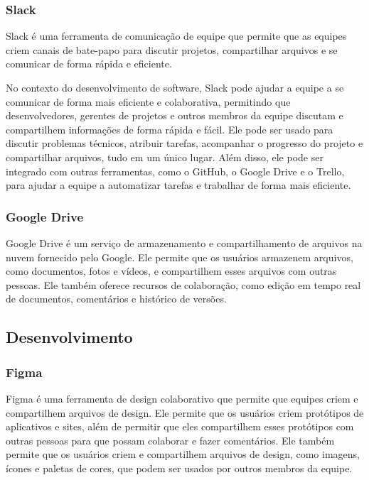 \subsubsection{Slack}

Slack é uma ferramenta de comunicação de equipe que permite que as equipes criem canais de bate-papo para discutir projetos, compartilhar arquivos e se comunicar de forma rápida e eficiente.

No contexto do desenvolvimento de software, Slack pode ajudar a equipe a se comunicar de forma mais eficiente e colaborativa, permitindo que desenvolvedores, gerentes de projetos e outros membros da equipe discutam e compartilhem informações de forma rápida e fácil. Ele pode ser usado para discutir problemas técnicos, atribuir tarefas, acompanhar o progresso do projeto e compartilhar arquivos, tudo em um único lugar. Além disso, ele pode ser integrado com outras ferramentas, como o GitHub, o Google Drive e o Trello, para ajudar a equipe a automatizar tarefas e trabalhar de forma mais eficiente.

\subsubsection{Google Drive}

Google Drive é um serviço de armazenamento e compartilhamento de arquivos na nuvem fornecido pelo Google. Ele permite que os usuários armazenem arquivos, como documentos, fotos e vídeos, e compartilhem esses arquivos com outras pessoas. Ele também oferece recursos de colaboração, como edição em tempo real de documentos, comentários e histórico de versões.

\subsection{Desenvolvimento}

\subsubsection{Figma}

Figma é uma ferramenta de design colaborativo que permite que equipes criem e compartilhem arquivos de design. Ele permite que os usuários criem protótipos de aplicativos e sites, além de permitir que eles compartilhem esses protótipos com outras pessoas para que possam colaborar e fazer comentários. Ele também permite que os usuários criem e compartilhem arquivos de design, como imagens, ícones e paletas de cores, que podem ser usados por outros membros da equipe.

